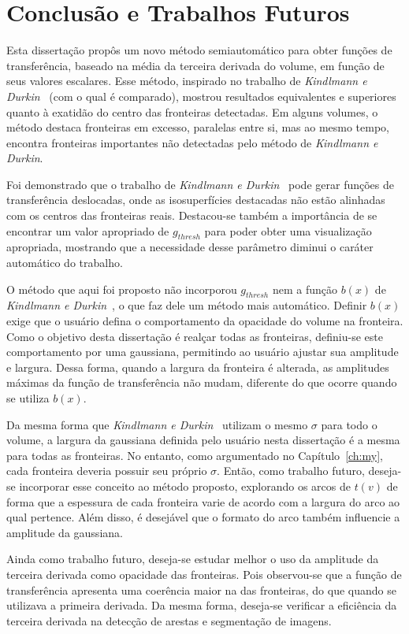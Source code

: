 
\chapter{Conclusão e Trabalhos Futuros}
\label{ch:conclusion}
	Esta dissertação propôs um novo método semiautomático para obter funções de transferência, baseado na média da terceira derivada do volume, em função de seus valores escalares. Esse método, inspirado no trabalho de \textit{Kindlmann e Durkin}~\cite{gordon} (com o qual é comparado), mostrou resultados equivalentes e superiores quanto à exatidão do centro das fronteiras detectadas. Em alguns volumes, o método destaca fronteiras em excesso, paralelas entre si, mas ao mesmo tempo, encontra fronteiras importantes não detectadas pelo método de \textit{Kindlmann e Durkin}.

	Foi demonstrado que o trabalho de \textit{Kindlmann e Durkin}~\cite{gordon} pode gerar funções de transferência deslocadas, onde as isosuperfícies destacadas não estão alinhadas com os centros das fronteiras reais. Destacou-se também a importância de se encontrar um valor apropriado de $ g_{thresh} $ para poder obter uma visualização apropriada, mostrando que a necessidade desse parâmetro diminui o caráter automático do trabalho.
	
	O método que aqui foi proposto não incorporou $ g_{thresh} $ nem a função $ b(x) $ de \textit{Kindlmann e Durkin}~\cite{gordon}, o que faz dele um método mais automático. Definir $ b(x) $ exige que o usuário defina o comportamento da opacidade do volume na fronteira. Como o objetivo desta dissertação é realçar todas as fronteiras, definiu-se este comportamento por uma gaussiana, permitindo ao usuário ajustar sua amplitude e largura. Dessa forma, quando a largura da fronteira é alterada, as amplitudes máximas da função de transferência não mudam, diferente do que ocorre quando se utiliza $ b(x) $.
	
	Da mesma forma que \textit{Kindlmann e Durkin}~\cite{gordon} utilizam o mesmo $ \sigma $ para todo o volume, a largura da gaussiana definida pelo usuário nesta dissertação é a mesma para todas as fronteiras. No entanto, como argumentado no Capítulo~\ref{ch:my}, cada fronteira deveria possuir seu próprio $ \sigma $. Então, como trabalho futuro, deseja-se incorporar esse conceito ao método proposto, explorando os arcos de $ t(v) $ de forma que a espessura de cada fronteira varie de acordo com a largura do arco ao qual pertence. Além disso, é desejável que o formato do arco também influencie a amplitude da gaussiana.
	
	Ainda como trabalho futuro, deseja-se estudar melhor o uso da amplitude da terceira derivada como opacidade das fronteiras. Pois observou-se que a função de transferência apresenta uma coerência maior na  das fronteiras, do que quando se utilizava a primeira derivada. Da mesma forma, deseja-se verificar a eficiência da terceira derivada na detecção de arestas e segmentação de imagens.